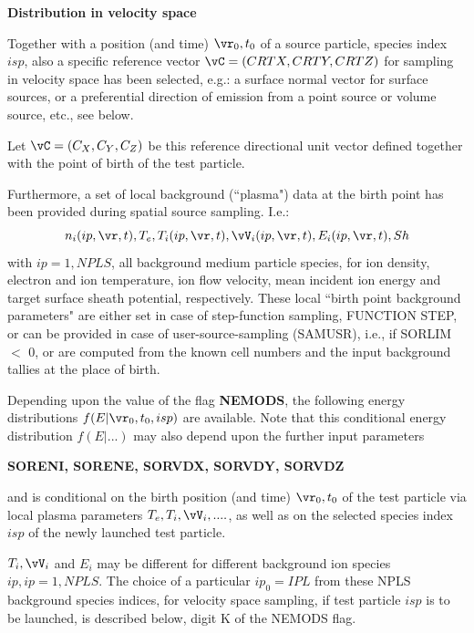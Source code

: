 \medskip

\noindent

{\bf Distribution in velocity space}

\medskip

\noindent

Together with a position (and time) $\vr_0,t_0$
of a source particle, species index $isp$,  also a specific
reference vector $\vC = (CRTX,CRTY,CRTZ)$ for sampling in
velocity space has been selected, e.g.: a surface normal
vector for surface sources, or a preferential direction of emission
from a point source or volume source, etc., see below.

Let $\vC = (C_X,C_Y,C_Z)$ be this reference directional unit vector
defined together with the point of birth of the test particle.

Furthermore, a set of local background (``plasma") data at the birth point has been provided
during spatial source sampling. I.e.:
\begin{equation}\label{local-source}
n_i(ip,\vr,t), T_e, T_i(ip,\vr,t), \vV_i(ip,\vr,t), E_i(ip,\vr,t), Sh
\end{equation}
with $ip=1, NPLS$, all background medium particle species,
for ion density, electron and ion temperature,
ion flow velocity, mean incident ion energy
and target surface sheath potential,
respectively. These local ``birth point background parameters"
are either set in case of step-function sampling, FUNCTION STEP,
or can be provided in case of user-source-sampling (SAMUSR), i.e., if  SORLIM $<$
0, or are computed from the known cell numbers and the input
background tallies at the place of birth.

Depending upon the value of the flag {\bf NEMODS}, the following
energy distributions $f(E|\vr_0,t_0,isp)$ are available. Note that this conditional energy distribution
$f(E|...)$ may also
depend upon the further input parameters

{\bf SORENI, SORENE, SORVDX, SORVDY, SORVDZ}

and is conditional on the birth position (and time) $\vr_0,t_0$
of the test particle
via local plasma parameters
$T_e ,   T_i , \vV_i, .... $, as well as on the
selected species index $isp$ of the newly launched
test particle.

$T_i,\vV_i$ and $E_i$ may be different for different background ion
species $ip,  ip = 1,NPLS$.
The choice of a particular $ip_0=IPL$ from these
NPLS background species indices, for velocity space
sampling, if test particle $isp$ is to be launched, is described below,
digit K of the NEMODS flag.

